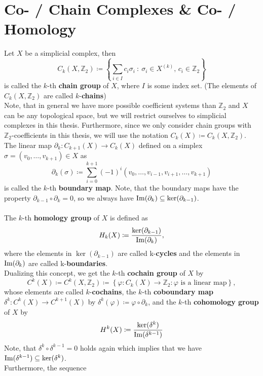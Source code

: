 \section*{Co- / Chain Complexes \& Co- / Homology}

Let \(X\) be a simplicial complex, then
\[
C_k(X,\mathbb{Z}_2)\coloneqq \left\{\sum\limits_{i\in I}c_i\sigma_i\::\:\sigma_i\in X^{(k)}\text{, }c_i\in\mathbb{Z}_2\right\}
\]
is called the \(k\)-th \textbf{chain group} of \(X\), where \(I\) is some index set. (The elements of \(C_k(X,\mathbb{Z}_2)\) are called \(k\)-\textbf{chains})\\
Note, that in general we have more possible coefficient systems than \(\mathbb{Z}_2\) and \(X\) can be any topological space, but we will restrict ourselves to simplicial complexes in this thesis. Furthermore, since we only consider chain groups with \(\mathbb{Z}_2\)-coefficients in this thesis, we will use the notation \(C_k(X)\coloneqq C_k(X,\mathbb{Z}_2)\).\\
The linear map \(\partial_k:C_{k+1}(X)\rightarrow C_k(X)\) defined on a simplex \(\sigma=(v_0,\ldots,v_{k+1})\in X\) as
\[
\partial_k(\sigma)\coloneqq \sum\limits_{i=0}^{k+1}(-1)^i(v_0,\ldots,v_{i-1},v_{i+1},\ldots,v_{k+1})
\]
is called the \(k\)-th \textbf{boundary map}. Note, that the boundary maps have the property \(\partial_{k-1}\circ\partial_k=0\), so we always have \(\mathrm{Im}(\partial_k)\subseteq\ker(\partial_{k-1})\).\\
\\
The \(k\)-th \textbf{homology group} of \(X\) is defined as
\[
H_k(X)\coloneqq \frac{\ker(\partial_{k-1})}{\mathrm{Im}(\partial_k)},
\]
where the elements in \(\ker(\partial_{k-1})\) are called k-\textbf{cycles} and the elements in \(\mathrm{Im}(\partial_k)\) are called k-\textbf{boundaries}.\\
Dualizing this concept, we get the \(k\)-th \textbf{cochain group} of \(X\) by
\[
C^k(X)\coloneqq C^k(X,\mathbb{Z}_2)\coloneqq \left\{\varphi:C_k(X)\rightarrow\mathbb{Z}_2:\varphi\text{ is a linear map}\right\},
\]
whose elements are called \(k\)-\textbf{cochains}, the \(k\)-th \textbf{coboundary map}\\
\(\delta^k:C^k(X)\rightarrow C^{k+1}(X)\) by \(\delta^k(\varphi)\coloneqq \varphi\circ\partial_k\), and the \(k\)-th \textbf{cohomology group} of \(X\) by
\[
H^k(X)\coloneqq \frac{\ker(\delta^k)}{\mathrm{Im}(\delta^{k-1})}
\]
Note, that \(\delta^k\circ\delta^{k-1}=0\) holds again which implies that we have \(\mathrm{Im}(\delta^{k-1})\subseteq\ker(\delta^k)\).\\
Furthermore, the sequence
